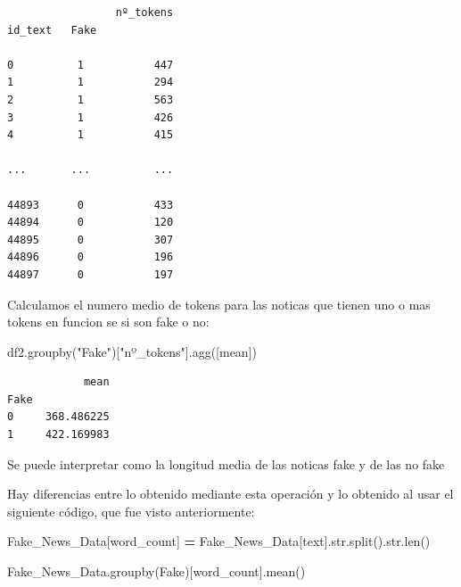 \documentclass[
  11pt,
  a4paper,
]{article}
\newenvironment{Shaded}{\begin{snugshade}}{\end{snugshade}}
\newcommand{\BuiltInTok}[1]{#1}
\newcommand{\NormalTok}[1]{#1}
\newcommand{\OperatorTok}[1]{\textcolor[rgb]{0.81,0.36,0.00}{\textbf{#1}}}
\newcommand{\StringTok}[1]{\textcolor[rgb]{0.31,0.60,0.02}{#1}}
\begin{document}
\begin{verbatim}
                 nº_tokens
id_text   Fake           

0          1           447
1          1           294
2          1           563
3          1           426
4          1           415

...       ...          ...

44893      0           433
44894      0           120
44895      0           307
44896      0           196
44897      0           197
\end{verbatim}

Calculamos el numero medio de tokens para las noticas que tienen uno o
mas tokens en funcion se si son fake o no:

\begin{Shaded}
\begin{Highlighting}[]
\NormalTok{df2.groupby(}\StringTok{"Fake"}\NormalTok{)[}\StringTok{"nº\_tokens"}\NormalTok{].agg([}\StringTok{\textquotesingle{}mean\textquotesingle{}}\NormalTok{])}
\end{Highlighting}
\end{Shaded}

\begin{verbatim}
            mean
Fake            
0     368.486225
1     422.169983
\end{verbatim}

Se puede interpretar como la longitud media de las noticas fake y de las
no fake

\vspace{0.5cm}

Hay diferencias entre lo obtenido mediante esta operación y lo obtenido
al usar el siguiente código, que fue visto anteriormente:

\begin{Shaded}
\begin{Highlighting}[]
\NormalTok{Fake\_News\_Data[}\StringTok{\textquotesingle{}word\_count\textquotesingle{}}\NormalTok{] }\OperatorTok{=}\NormalTok{ Fake\_News\_Data[}\StringTok{\textquotesingle{}text\textquotesingle{}}\NormalTok{].}\BuiltInTok{str}\NormalTok{.split().}\BuiltInTok{str}\NormalTok{.}\BuiltInTok{len}\NormalTok{()}

\NormalTok{Fake\_News\_Data.groupby(}\StringTok{\textquotesingle{}Fake\textquotesingle{}}\NormalTok{)[}\StringTok{\textquotesingle{}word\_count\textquotesingle{}}\NormalTok{].mean()}
\end{Highlighting}
\end{Shaded}
\end{document}
